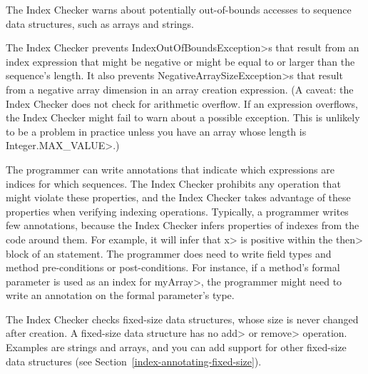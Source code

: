 
The Index Checker warns about potentially out-of-bounds accesses to sequence
data structures, such as arrays
and strings.

The Index Checker prevents \<IndexOutOfBoundsException>s that result from
an index expression that might be negative or might be equal to or larger
than the sequence's length.
It also prevents \<NegativeArraySizeException>s that result from a negative
array dimension in an array creation expression.
(A caveat: the Index Checker does not check for arithmetic overflow. If
an expression overflows, the Index Checker might fail to warn about a
possible exception.  This is unlikely to be a problem in practice unless
you have an array whose length is \<Integer.MAX\_VALUE>.)

%

The programmer can write annotations that indicate which expressions are
indices for which sequences.  The Index Checker prohibits any operation that
might violate these properties, and the Index Checker takes advantage of
these properties when verifying indexing operations.
%
Typically, a programmer writes few annotations, because the Index Checker
infers properties of indexes from
the code around them. For example, it will infer that \<x> is positive
within the \<then> block of an  statement.
The programmer does need to write field types and method pre-conditions or post-conditions. For instance,
if a method's formal parameter is used as an index for
\<myArray>, the programmer might need to
write an 
annotation on the formal parameter's type.

The Index Checker checks fixed-size data structures, whose size is never
changed after creation.  A fixed-size data structure has no \<add> or
\<remove> operation.  Examples are strings and arrays, and you can add
support for other fixed-size data structures (see
Section~\ref{index-annotating-fixed-size}).

